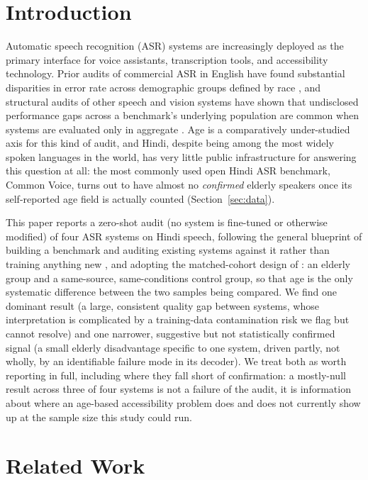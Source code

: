 \documentclass[11pt]{article}
\begin{document}
\section{Introduction}

Automatic speech recognition (ASR) systems are increasingly deployed as the primary interface
for voice assistants, transcription tools, and accessibility technology. Prior audits of
commercial ASR in English have found substantial disparities in error rate across demographic
groups defined by race \citep{koenecke2020racial}, and structural audits of other speech and
vision systems have shown that undisclosed performance gaps across a benchmark's underlying
population are common when systems are evaluated only in aggregate \citep{buolamwini2018gender}.
Age is a comparatively under-studied axis for this kind of audit, and Hindi, despite being
among the most widely spoken languages in the world, has very little public infrastructure for
answering this question at all: the most commonly used open Hindi ASR benchmark, Common Voice,
turns out to have almost no \emph{confirmed} elderly speakers once its self-reported age field is
actually counted (Section~\ref{sec:data}).

This paper reports a zero-shot audit (no system is fine-tuned or otherwise modified) of four
ASR systems on Hindi speech, following the general blueprint of building a benchmark and auditing
existing systems against it rather than training anything new \citep{buolamwini2018gender}, and
adopting the matched-cohort design of \citet{koenecke2020racial}: an elderly group and a
same-source, same-conditions control group, so that age is the only systematic difference between
the two samples being compared. We find one dominant result (a large, consistent quality gap
between systems, whose interpretation is complicated by a training-data contamination risk we
flag but cannot resolve) and one narrower, suggestive but not statistically confirmed signal (a
small elderly disadvantage specific to one system, driven partly, not wholly, by an identifiable
failure mode in its decoder). We treat both as worth reporting in full, including where they fall
short of confirmation: a mostly-null result across three of four systems is not a failure of the
audit, it is information about where an age-based accessibility problem does and does not
currently show up at the sample size this study could run.

\section{Related Work}
\end{document}
